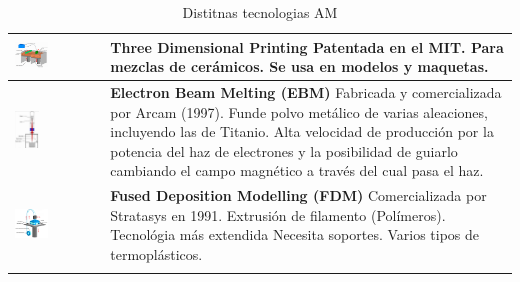 \begin{longtable}{| >{\centering\arraybackslash}m{8cm} | >{\centering\arraybackslash}m{7cm}|}
     \hline
    \centering\includegraphics[width=0.4\textwidth]{./images/3d_mit.png}
    & \textbf{Three Dimensional Printing}
     Patentada en el MIT.
     Para mezclas de cerámicos.
     Se usa en modelos y maquetas.\\[95pt]
    \hline
    \centering\includegraphics[width=0.3\textwidth]{./images/ebm.png}
    & \textbf{Electron Beam Melting (EBM)}
     Fabricada y comercializada por Arcam (1997).
     Funde polvo metálico de varias aleaciones, incluyendo las de Titanio.
     Alta velocidad de producción por la potencia del haz de electrones y la posibilidad de guiarlo cambiando el campo magnético a través del cual pasa el haz.\\[80pt]
    \hline
    \centering\includegraphics[width=0.4\textwidth]{./images/fdm.png}
    & \textbf{Fused Deposition Modelling (FDM)}
     Comercializada por Stratasys en 1991.
     Extrusión de filamento (Polímeros).
     Tecnológia más extendida
     Necesita soportes.
     Varios tipos de termoplásticos.\\[150pt]
     \hline


     \caption{Distitnas tecnologias AM}
     \label{tab:AM}
\end{longtable}


